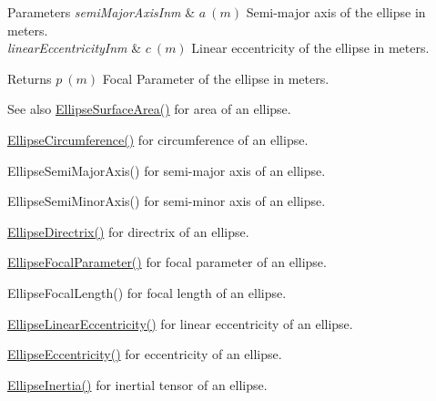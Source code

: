 \begin{DoxyParams}{Parameters}
{\em semi\+Major\+Axis\+Inm} & $ a\ (m)$ Semi-\/major axis of the ellipse in meters. \\
\hline
{\em linear\+Eccentricity\+Inm} & $ c\ (m)$ Linear eccentricity of the ellipse in meters. \\
\hline
\end{DoxyParams}
\begin{DoxyReturn}{Returns}
$ p\ (m)$ Focal Parameter of the ellipse in meters. 
\end{DoxyReturn}
\begin{DoxySeeAlso}{See also}
\mbox{\hyperlink{group___e_g_x_math-_geometry-2_d-_ellipse-_surface_area_ga4ce8c8323e9718ce5458f4ab7f6d823d}{Ellipse\+Surface\+Area()}} for area of an ellipse. 

\mbox{\hyperlink{group___e_g_x_math-_geometry-2_d-_ellipse-_circumference_ga4172802ac674eb53467b44928ac635c7}{Ellipse\+Circumference()}} for circumference of an ellipse. 

Ellipse\+Semi\+Major\+Axis() for semi-\/major axis of an ellipse. 

Ellipse\+Semi\+Minor\+Axis() for semi-\/minor axis of an ellipse. 

\mbox{\hyperlink{group___e_g_x_math-_geometry-2_d-_ellipse-_directrix_gace8f72a8efbc9c18d3eb689151405106}{Ellipse\+Directrix()}} for directrix of an ellipse. 

\mbox{\hyperlink{group___e_g_x_math-_geometry-2_d-_ellipse-_focal_parameter_ga4cd01a38c72c092ef9791351948bf69b}{Ellipse\+Focal\+Parameter()}} for focal parameter of an ellipse. 

Ellipse\+Focal\+Length() for focal length of an ellipse. 

\mbox{\hyperlink{group___e_g_x_math-_geometry-2_d-_ellipse-_linear_eccentricity_gac70b3010e30aa8b73deb50fe2b9b9a91}{Ellipse\+Linear\+Eccentricity()}} for linear eccentricity of an ellipse. 

\mbox{\hyperlink{group___e_g_x_math-_geometry-2_d-_ellipse-_eccentricity_ga6a0a7fba17f782616894cfc447628c33}{Ellipse\+Eccentricity()}} for eccentricity of an ellipse. 

\mbox{\hyperlink{group___e_g_x_math-_geometry-2_d-_ellipse-_inertia_ga10a3049c2f04b50f271fb01dc62e4cf8}{Ellipse\+Inertia()}} for inertial tensor of an ellipse. 
\end{DoxySeeAlso}
\mbox{\label{group___e_g_x_math-_geometry-2_d-_ellipse-_focal_parameter_gaf957cf9131d3998bfe944f6234a133e6}} 
